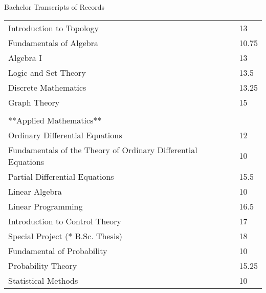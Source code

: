 \begin{cSection}{Bachelor Transcripts of Records}
\begin{tabular}{ @{} l l }
	Introduction to Topology & 13 \\%
	
	Fundamentals of Algebra & 10.75 \\%
	Algebra I & 13 \\%
	Logic and Set Theory  & 13.5 \\%
	Discrete Mathematics & 13.25 \\%
	Graph Theory & 15 \\%
	\cline{1-2}\\
	
	**Applied Mathematics**&\\%
	Ordinary Differential Equations & 12 \\%
	Fundamentals of the Theory of Ordinary Differential Equations & 10 \\%
	Partial Differential Equations & 15.5 \\%
	Linear Algebra & 10 \\%
	
	Linear Programming & 16.5 \\%
	Introduction to Control Theory & 17 \\%
	
	Special Project (* B.Sc. Thesis) & 18 \\%
	
	Fundamental of Probability & 10 \\%
	Probability Theory & 15.25 \\%
	Statistical Methods & 10 \\%
	

\end{tabular}
\end{cSection}

